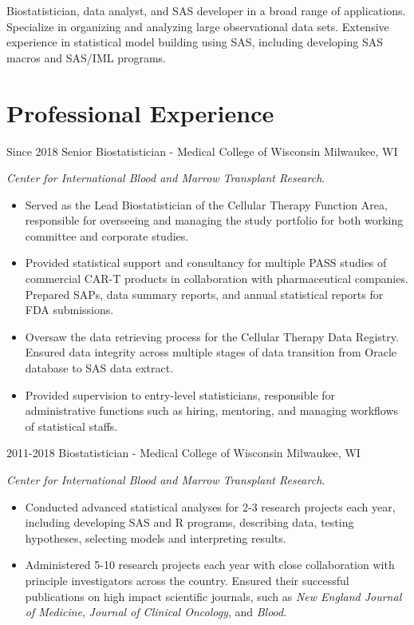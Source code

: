 Biostatistician, data analyst, and SAS developer in a broad range of applications. Specialize in organizing and analyzing large observational data sets. Extensive experience in statistical model building using SAS, including developing SAS macros and SAS/IML programs.\\

\section{Professional Experience}

\begin{entrylist}
  \entry
    {Since 2018}
    {Senior Biostatistician - Medical College of Wisconsin}
    {Milwaukee, WI}
    {
      \textit{Center for International Blood and Marrow Transplant Research}.
      \begin{itemize}
        \item Served as the Lead Biostatistician of the Cellular Therapy Function Area, responsible for overseeing and managing the study portfolio for both working committee and corporate studies.
        \item Provided statistical support and consultancy for multiple PASS studies of commercial CAR-T products in collaboration with pharmaceutical companies. Prepared SAPs, data summary reports, and annual statistical reports for FDA submissions.
        \item Oversaw the data retrieving process for the Cellular Therapy Data Registry. Ensured data integrity across multiple stages of data transition from Oracle database to SAS data extract.
        \item Provided supervision to entry-level statisticians, responsible for administrative functions such as hiring, mentoring, and managing workflows of statistical staffs.
      \end{itemize}
    }
  \entry
    {2011-2018}
    {Biostatistician - Medical College of Wisconsin}
    {Milwaukee, WI}
    {
      \textit{Center for International Blood and Marrow Transplant Research}.
      \begin{itemize}
        \item Conducted advanced statistical analyses for 2-3 research projects each year, including developing SAS and R programs, describing data, testing hypotheses, selecting models and interpreting results.
        \item Administered 5-10 research projects each year with close collaboration with principle investigators across the country. Ensured their successful publications on high impact scientific journals, such as \textit{New England Journal of Medicine}, \textit{Journal of Clinical Oncology}, and \textit{Blood}.

\end{itemize}}
\end{entrylist}
